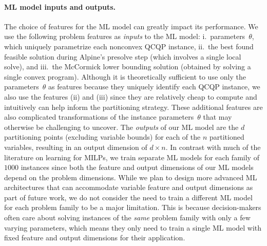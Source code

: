 \documentclass{article}
\newcommand{\pp}{partitioning points}
\begin{document}
\paragraph{ML model inputs and outputs.}
The choice of features for the ML model can greatly impact its performance. 
We use the following problem features as \textit{inputs} to the ML model: i.\ parameters~$\theta$, which uniquely parametrize each nonconvex QCQP instance, ii.\ the best found feasible solution during Alpine's presolve step (which involves a single local solve), and iii.\ the McCormick lower bounding solution (obtained by solving a single convex program). 
Although it is theoretically sufficient to use only the parameters~$\theta$ as features because they uniquely identify each QCQP instance, we also use the features (ii) and (iii) since they are relatively cheap to compute and intuitively can help inform the partitioning strategy. 
These additional features are also complicated transformations of the instance parameters~$\theta$ that may otherwise be challenging to uncover.
The \textit{outputs} of our ML model are the $d$ {\pp} (excluding variable bounds) for each of the $n$ partitioned variables, resulting in an output dimension of $d \times n$.
In contrast with much of the literature on learning for MILPs, we train separate ML models for each family of $1000$ instances since both the feature and output dimensions of our ML models depend on the problem dimensions.
While we plan to design more advanced ML architectures that can accommodate variable feature and output dimensions as part of future work, we do not consider the need to train a different ML model for each problem family to be a major limitation.
This is because decision-makers often care about solving instances of the \textit{same} problem family with only a few varying parameters, which means they only need to train a single ML model with fixed feature and output dimensions for their application.
\end{document}
